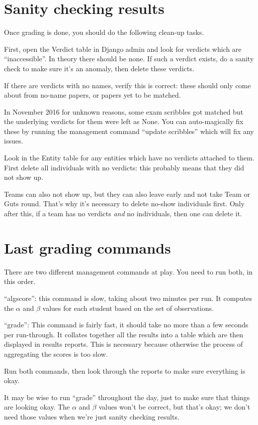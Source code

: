 \section{Sanity checking results}
Once grading is done, you should do the following clean-up tasks.
\begin{itemize}
	\ii First, open the Verdict table in Django admin and look for verdicts which
	are ``inaccessible''.
	In theory there should be none.
	If such a verdict exists, do a sanity check to make sure it's an anomaly,
	then delete these verdicts.

	\ii If there are verdicts with no names, verify this is correct:
	these should only come about from no-name papers,
	or papers yet to be matched.

	In November 2016 for unknown reasons, some exam scribbles got matched
	but the underlying verdicts for them were left as None.
	You can auto-magically fix these by running the
	management command ``update scribbles''
	which will fix any issues.

	\ii Look in the Entity table for any entities which have
	no verdicts attached to them.
	First delete all individuals with no verdicts:
	this probably means that they did not show up.

	Teams can also not show up,
	but they can also leave early and not take Team or Guts round.
	That's why it's necessary to delete no-show individuals first.
	Only after this, if a team has no verdicts \emph{and} no individuals,
	then one can delete it.
\end{itemize}

\section{Last grading commands}
There are two different management commands at play.
You need to run both, in this order.

\begin{itemize} 
	\ii ``algscore'': this command is slow, taking about two minutes per run.
	It computes the $\alpha$ and $\beta$ values for each student
	based on the set of observations.

	\ii ``grade'': This command is fairly fast, it should take no more than
	a few seconds per run-through.
	It collates together all the results into a table which
	are then displayed in results reports.
	This is necessary because otherwise the process of aggregating the scores
	is too slow.
\end{itemize}

Run both commands, then look through the reports to make sure everything is okay.

It may be wise to run ``grade'' throughout the day,
just to make sure that things are looking okay.
The $\alpha$ and $\beta$ values won't be correct, but that's okay;
we don't need those values when we're just sanity checking results.
